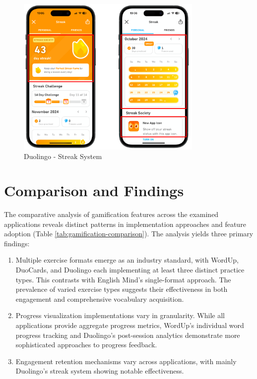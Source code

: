 \begin{itemize}
    \begin{figure}[!h]
        \includegraphics[width=0.8\textwidth]{src/figures/duolingo-streak.png}
        \caption{Duolingo - Streak System}
        \label{fig:duolingo-daily-streak}
    \end{figure}
\end{itemize}

\section{Comparison and Findings}

The comparative analysis of gamification features across the examined applications reveals distinct patterns in implementation approaches and feature adoption (Table \ref{tab:gamification-comparison}). The analysis yields three primary findings:
\begin{enumerate}
    \item Multiple exercise formats emerge as an industry standard, with WordUp, DuoCards, and Duolingo each implementing at least three distinct practice types. This contrasts with English Mind's single-format approach. The prevalence of varied exercise types suggests their effectiveness in both engagement and comprehensive vocabulary acquisition.

    \item Progress visualization implementations vary in granularity. While all applications provide aggregate progress metrics, WordUp's individual word progress tracking and Duolingo's post-session analytics demonstrate more sophisticated approaches to progress feedback.
    
    \item Engagement retention mechanisms vary across applications, with mainly Duolingo's streak system showing notable effectiveness.
\end{enumerate}

